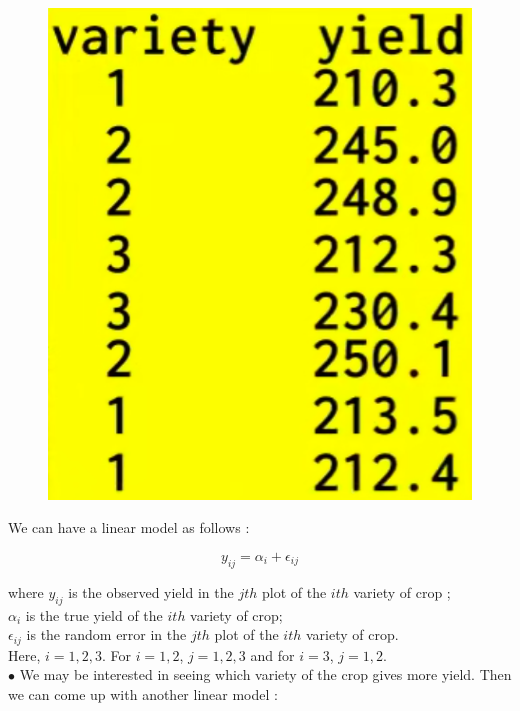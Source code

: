\documentclass[11pt, a4paper]{article}\usepackage[]{graphicx}\usepackage[]{xcolor}
\begin{document}
\begin{figure}[H]
  \centering
  \includegraphics[scale = 0.5]{dataset} \\
\end{figure}


We can have a linear model as follows :

$$y_{ij} = \alpha_i + \epsilon_{ij}$$

where $y_{ij}$ is the observed yield in the $jth$ plot of the $ith$ variety of crop ; \\

$\alpha_i$ is the true yield of the $ith$ variety of crop; \\

$\epsilon_{ij}$ is the random error in the $jth$ plot of the $ith$ variety of crop. \\

Here, $i = 1, 2, 3$. For $i = 1, 2$, $j = 1, 2, 3$ and for $i = 3$, $j = 1, 2$. \\

$\bullet$ We may be interested in seeing which variety of the crop gives more yield. Then we can come up with another linear model :
\end{document}
